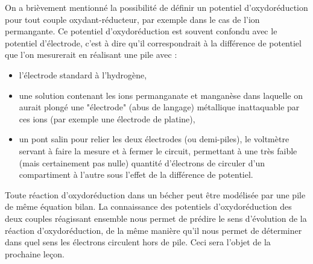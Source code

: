 \documentclass[11pt,a4paper]{report}
\begin{document}
On a brièvement mentionné la possibilité de définir un potentiel d'oxydoréduction pour tout couple oxydant-réducteur, par exemple dans le cas de l'ion permangante. Ce potentiel d'oxydoréduction est souvent confondu avec le potentiel d'électrode, c'est à dire qu'il correspondrait à la différence de potentiel que l'on mesurerait en réalisant une pile avec :
\begin{itemize}
	\item l'électrode standard à l'hydrogène,
	\item une solution contenant les ions permanganate et manganèse dans laquelle on aurait plongé une "électrode" (abus de langage) métallique inattaquable par ces ions (par exemple une électrode de platine),
	\item un pont salin pour relier les deux électrodes (ou demi-piles), le voltmètre servant à faire la mesure et à fermer le circuit, permettant à une très faible (mais certainement pas nulle) quantité d'électrons de circuler d'un compartiment à l'autre sous l'effet de la différence de potentiel.
\end{itemize}
Toute réaction d'oxydoréduction dans un bécher peut être modélisée par une pile de même équation bilan. La connaissance des potentiels d'oxydoréduction des deux couples réagissant ensemble nous permet de prédire le sens d'évolution de la réaction d'oxydoréduction, de la même manière qu'il nous permet de déterminer dans quel sens les électrons circulent hors de pile. Ceci sera l'objet de la prochaine leçon.
\end{document}
